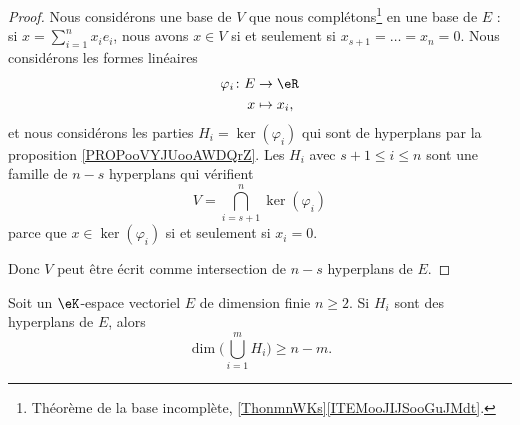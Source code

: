 \begin{proof}
    Nous considérons une base de \( V\) que nous complétons\footnote{Théorème de la base incomplète, \ref{ThonmnWKs}\ref{ITEMooJIJSooGuJMdt}.} en une base de \( E\) : si \( x=\sum_{i=1}^nx_ie_i\), nous avons \( x\in V\) si et seulement si \( x_{s+1}=\ldots=x_n=0\). Nous considérons les formes linéaires
    \begin{equation}
        \begin{aligned}
            \varphi_i\colon E&\to \eR \\
            x&\mapsto x_i, 
        \end{aligned}
    \end{equation}
    et nous considérons les parties \( H_i=\ker(\varphi_i)\) qui sont de hyperplans par la proposition \ref{PROPooVYJUooAWDQrZ}. Les \( H_i\) avec \( s+1\leq i\leq n\) sont une famille de \( n-s\) hyperplans qui vérifient
    \begin{equation}
        V=\bigcap_{i=s+1}^n\ker(\varphi_i)
    \end{equation}
    parce que \( x\in \ker(\varphi_i)\) si et seulement si \( x_i=0\).

    Donc \( V\) peut être écrit comme intersection de \( n-s\) hyperplans de \( E\).
\end{proof}

\begin{proposition}      \label{PROPooRCLNooJpIMMl}
    Soit un \( \eK\)-espace vectoriel \( E\) de dimension finie \( n\geq 2\). Si \( H_i\) sont des hyperplans de \( E\), alors
    \begin{equation}
        \dim\Big( \bigcup_{i=1}^mH_i \Big)\geq n-m.
    \end{equation}
\end{proposition}

